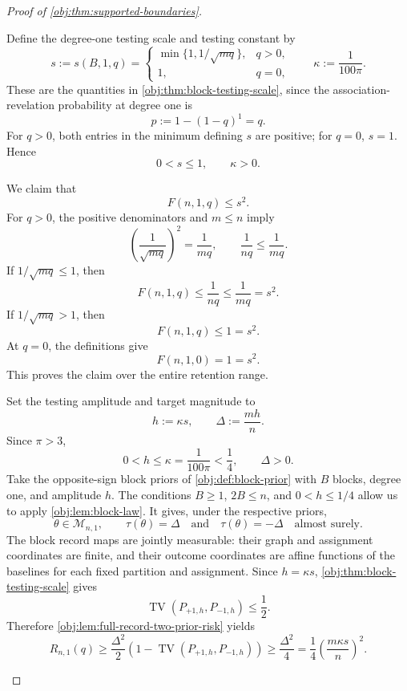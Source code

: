 \documentclass[11pt]{article}
\begin{document}
\begin{proof}[Proof of \cref{obj:thm:supported-boundaries}]
\begin{enumerate}
Define the degree-one testing scale and testing constant by
\[
s:=s(B,1,q)=
\begin{cases}
\min\{1,1/\sqrt{mq}\},&q>0,\\
1,&q=0,
\end{cases}
\qquad
\kappa:=\frac1{100\pi}.
\]
These are the quantities in \cref{obj:thm:block-testing-scale}, since the association-revelation probability at degree one is
\[
p:=1-(1-q)^1=q.
\]
For \(q>0\), both entries in the minimum defining \(s\) are positive; for \(q=0\), \(s=1\). Hence
\[
0<s\le1,\qquad \kappa>0.
\]

We claim that
\[
F(n,1,q)\le s^2.
\]
For \(q>0\), the positive denominators and \(m\le n\) imply
\[
\left(\frac1{\sqrt{mq}}\right)^2=\frac1{mq},
\qquad
\frac1{nq}\le\frac1{mq}.
\]
If \(1/\sqrt{mq}\le1\), then
\[
F(n,1,q)\le\frac1{nq}
\le\frac1{mq}=s^2.
\]
If \(1/\sqrt{mq}>1\), then
\[
F(n,1,q)\le1=s^2.
\]
At \(q=0\), the definitions give
\[
F(n,1,0)=1=s^2.
\]
This proves the claim over the entire retention range.

Set the testing amplitude and target magnitude to
\[
h:=\kappa s,
\qquad
\Delta:=\frac{mh}{n}.
\]
Since \(\pi>3\),
\[
0<h\le\kappa=\frac1{100\pi}<\frac14,
\qquad
\Delta>0.
\]
Take the opposite-sign block priors of \cref{obj:def:block-prior} with \(B\) blocks, degree one, and amplitude \(h\). The conditions \(B\ge1\), \(2B\le n\), and \(0<h\le1/4\) allow us to apply \cref{obj:lem:block-law}. It gives, under the respective priors,
\[
\theta\in\mathcal M_{n,1},
\qquad
\tau(\theta)=\Delta
\quad\text{and}\quad
\tau(\theta)=-\Delta
\quad\text{almost surely}.
\]
The block record maps are jointly measurable: their graph and assignment coordinates are finite, and their outcome coordinates are affine functions of the baselines for each fixed partition and assignment. Since \(h=\kappa s\), \cref{obj:thm:block-testing-scale} gives
\[
\operatorname{TV}(P_{+1,h},P_{-1,h})\le\frac12.
\]
Therefore \cref{obj:lem:full-record-two-prior-risk} yields
\[
R_{n,1}(q)
\ge
\frac{\Delta^2}{2}
\left(1-\operatorname{TV}(P_{+1,h},P_{-1,h})\right)
\ge
\frac{\Delta^2}{4}
=
\frac14\left(\frac{m\kappa s}{n}\right)^2.
\]


\end{enumerate}
\end{proof}
\end{document}

